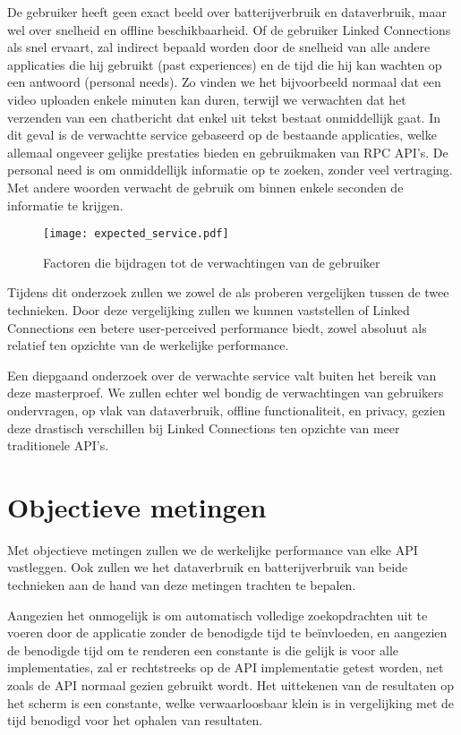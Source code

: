 De gebruiker heeft geen exact beeld over batterijverbruik en dataverbruik, maar wel over snelheid en offline beschikbaarheid. Of de gebruiker Linked Connections als snel ervaart, zal indirect bepaald worden door de snelheid van alle andere applicaties die hij gebruikt (past experiences) en de tijd die hij kan wachten op een antwoord (personal needs). Zo vinden we het bijvoorbeeld normaal dat een video uploaden enkele minuten kan duren, terwijl we verwachten dat het verzenden van een chatbericht dat enkel uit tekst bestaat onmiddellijk gaat. In dit geval is de verwachtte service gebaseerd op de bestaande applicaties, welke allemaal ongeveer gelijke prestaties bieden en gebruikmaken van RPC API's. De personal need is om onmiddellijk informatie op te zoeken, zonder veel vertraging. Met andere woorden verwacht de gebruik om binnen enkele seconden de informatie te krijgen.

\begin{figure}[h]
	\centering
	\texttt{[image: expected\_service.pdf]}
	\caption[Factoren die bijdragen tot de verwachtingen van de gebruiker]{Factoren die bijdragen tot de verwachtingen van de gebruiker}
	\label{fig:expectedserviceperceivedservice}
\end{figure}

Tijdens dit onderzoek zullen we zowel de  als  proberen vergelijken tussen de twee technieken. Door deze vergelijking zullen we kunnen vaststellen of Linked Connections een betere user-perceived performance biedt, zowel absoluut als relatief ten opzichte van de werkelijke performance.

Een diepgaand onderzoek over de verwachte service valt buiten het bereik van deze masterproef. We zullen echter wel bondig de verwachtingen van gebruikers ondervragen, op vlak van dataverbruik, offline functionaliteit, en privacy, gezien deze drastisch verschillen bij Linked Connections ten opzichte van meer traditionele API's.

\section{Objectieve metingen}

Met objectieve metingen zullen we de werkelijke performance van elke API vastleggen. Ook zullen we het dataverbruik en batterijverbruik van beide technieken aan de hand van deze metingen trachten te bepalen.

Aangezien het onmogelijk is om automatisch volledige zoekopdrachten uit te voeren door de applicatie zonder de benodigde tijd te beïnvloeden, en aangezien de benodigde tijd om te renderen een constante is die gelijk is voor alle implementaties, zal er rechtstreeks op de API implementatie getest worden, net zoals de API normaal gezien gebruikt wordt. Het uittekenen van de resultaten op het scherm is een constante, welke verwaarloosbaar klein is in vergelijking met de tijd benodigd voor het ophalen van resultaten.

